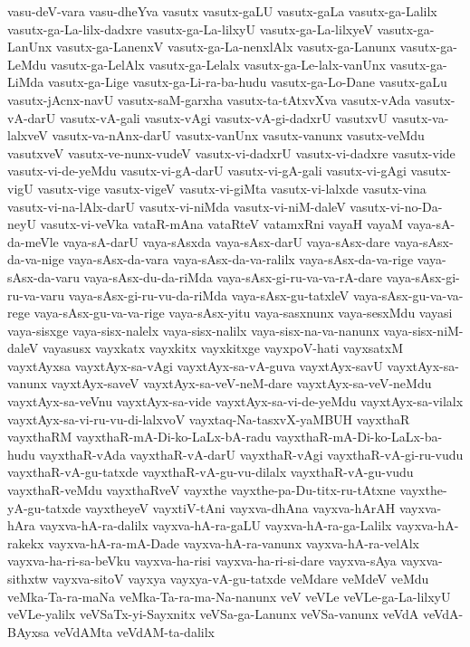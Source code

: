 {vasu-deV-vara
vasu-dheYva
vasutx
vasutx-gaLU
vasutx-gaLa
vasutx-ga-Lalilx
vasutx-ga-La-lilx-dadxre
vasutx-ga-La-lilxyU
vasutx-ga-La-lilxyeV
vasutx-ga-LanUnx
vasutx-ga-LanenxV
vasutx-ga-La-nenxlAlx
vasutx-ga-Lanunx
vasutx-ga-LeMdu
vasutx-ga-LelAlx
vasutx-ga-Lelalx
vasutx-ga-Le-lalx-vanUnx
vasutx-ga-LiMda
vasutx-ga-Lige
vasutx-ga-Li-ra-ba-hudu
vasutx-ga-Lo-Dane
vasutx-gaLu
vasutx-jAcnx-navU
vasutx-saM-garxha
vasutx-ta-tAtxvXva
vasutx-vAda
vasutx-vA-darU
vasutx-vA-gali
vasutx-vAgi
vasutx-vA-gi-dadxrU
vasutxvU
vasutx-va-lalxveV
vasutx-va-nAnx-darU
vasutx-vanUnx
vasutx-vanunx
vasutx-veMdu
vasutxveV
vasutx-ve-nunx-vudeV
vasutx-vi-dadxrU
vasutx-vi-dadxre
vasutx-vide
vasutx-vi-de-yeMdu
vasutx-vi-gA-darU
vasutx-vi-gA-gali
vasutx-vi-gAgi
vasutx-vigU
vasutx-vige
vasutx-vigeV
vasutx-vi-giMta
vasutx-vi-lalxde
vasutx-vina
vasutx-vi-na-lAlx-darU
vasutx-vi-niMda
vasutx-vi-niM-daleV
vasutx-vi-no-Da-neyU
vasutx-vi-veVka
vataR-mAna
vataRteV
vatamxRni
vayaH
vayaM
vaya-sA-da-meVle
vaya-sA-darU
vaya-sAsxda
vaya-sAsx-darU
vaya-sAsx-dare
vaya-sAsx-da-va-nige
vaya-sAsx-da-vara
vaya-sAsx-da-va-ralilx
vaya-sAsx-da-va-rige
vaya-sAsx-da-varu
vaya-sAsx-du-da-riMda
vaya-sAsx-gi-ru-va-va-rA-dare
vaya-sAsx-gi-ru-va-varu
vaya-sAsx-gi-ru-vu-da-riMda
vaya-sAsx-gu-tatxleV
vaya-sAsx-gu-va-va-rege
vaya-sAsx-gu-va-va-rige
vaya-sAsx-yitu
vaya-sasxnunx
vaya-sesxMdu
vayasi
vaya-sisxge
vaya-sisx-nalelx
vaya-sisx-nalilx
vaya-sisx-na-va-nanunx
vaya-sisx-niM-daleV
vayasusx
vayxkatx
vayxkitx
vayxkitxge
vayxpoV-hati
vayxsatxM
vayxtAyxsa
vayxtAyx-sa-vAgi
vayxtAyx-sa-vA-guva
vayxtAyx-savU
vayxtAyx-sa-vanunx
vayxtAyx-saveV
vayxtAyx-sa-veV-neM-dare
vayxtAyx-sa-veV-neMdu
vayxtAyx-sa-veVnu
vayxtAyx-sa-vide
vayxtAyx-sa-vi-de-yeMdu
vayxtAyx-sa-vilalx
vayxtAyx-sa-vi-ru-vu-di-lalxvoV
vayxtaq-Na-tasxvX-yaMBUH
vayxthaR
vayxthaRM
vayxthaR-mA-Di-ko-LaLx-bA-radu
vayxthaR-mA-Di-ko-LaLx-ba-hudu
vayxthaR-vAda
vayxthaR-vA-darU
vayxthaR-vAgi
vayxthaR-vA-gi-ru-vudu
vayxthaR-vA-gu-tatxde
vayxthaR-vA-gu-vu-dilalx
vayxthaR-vA-gu-vudu
vayxthaR-veMdu
vayxthaRveV
vayxthe
vayxthe-pa-Du-titx-ru-tAtxne
vayxthe-yA-gu-tatxde
vayxtheyeV
vayxtiV-tAni
vayxva-dhAna
vayxva-hArAH
vayxva-hAra
vayxva-hA-ra-dalilx
vayxva-hA-ra-gaLU
vayxva-hA-ra-ga-Lalilx
vayxva-hA-rakekx
vayxva-hA-ra-mA-Dade
vayxva-hA-ra-vanunx
vayxva-hA-ra-velAlx
vayxva-ha-ri-sa-beVku
vayxva-ha-risi
vayxva-ha-ri-si-dare
vayxva-sAya
vayxva-sithxtw
vayxva-sitoV
vayxya
vayxya-vA-gu-tatxde
veMdare
veMdeV
veMdu
veMka-Ta-ra-maNa
veMka-Ta-ra-ma-Na-nanunx
veV
veVLe
veVLe-ga-La-lilxyU
veVLe-yalilx
veVSaTx-yi-Sayxnitx
veVSa-ga-Lanunx
veVSa-vanunx
veVdA
veVdA-BAyxsa
veVdAMta
veVdAM-ta-dalilx
}
